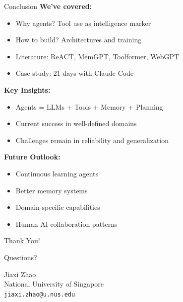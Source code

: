 \documentclass[aspectratio=169]{beamer}
\begin{document}
\begin{frame}{Conclusion}
	\textbf{We've covered:}
	\begin{itemize}
		\item {\color{highlight}Why agents?} Tool use as intelligence marker
		\item {\color{highlight}How to build?} Architectures and training
		\item {\color{highlight}Literature:} ReACT, MemGPT, Toolformer, WebGPT
		\item {\color{highlight}Case study:} 21 days with Claude Code
	\end{itemize}
	
	\textbf{Key Insights:}
	\begin{itemize}
		\item Agents = LLMs + Tools + Memory + Planning
		\item Current success in well-defined domains
		\item Challenges remain in reliability and generalization
	\end{itemize}
	
	\textbf{Future Outlook:}
	\begin{itemize}
		\item Continuous learning agents
		\item Better memory systems
		\item Domain-specific capabilities
		\item Human-AI collaboration patterns
	\end{itemize}
\end{frame}

\begin{frame}
	\begin{center}
		\Huge Thank You!
		
		\vspace{1cm}
		
		\Large Questions?
		
		\vspace{1cm}
		
		\normalsize
		Jiaxi Zhao\\
		National University of Singapore\\
		\texttt{jiaxi.zhao@u.nus.edu}
	\end{center}
\end{frame}
\end{document}
